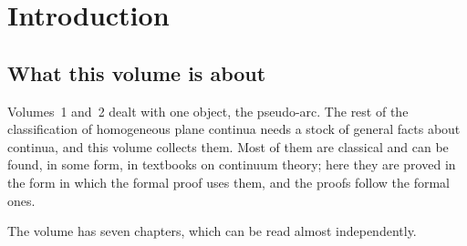 \chapter{Introduction}\label{ch:intro}

\section{What this volume is about}

Volumes~1 and~2 dealt with one object, the pseudo-arc. The rest of the classification of
homogeneous plane continua needs a stock of general facts about continua, and this volume
collects them. Most of them are classical and can be found, in some form, in textbooks on
continuum theory; here they are proved in the form in which the formal proof uses them, and
the proofs follow the formal ones.

The volume has seven chapters, which can be read almost independently.

